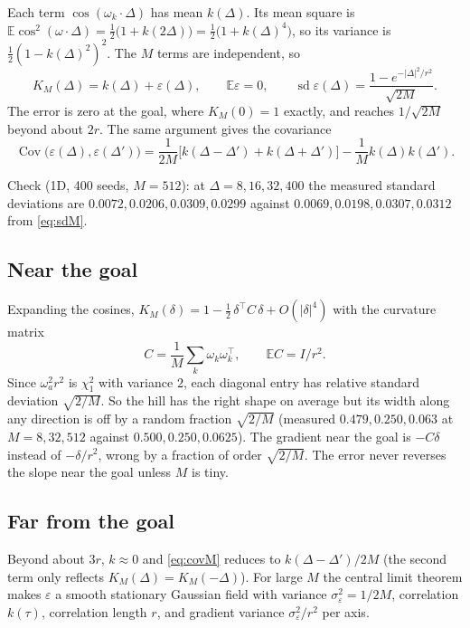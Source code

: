 \documentclass[11pt]{article}
\newcommand{\E}{\mathbb{E}}
\newcommand{\Cov}{\operatorname{Cov}}
\begin{document}
Each term $\cos(\omega_k\cdot\Delta)$ has mean $k(\Delta)$. Its mean square is
$\E\cos^2(\omega\cdot\Delta) = \tfrac12\bigl(1 + k(2\Delta)\bigr) = \tfrac12\bigl(1 + k(\Delta)^4\bigr)$,
so its variance is $\tfrac12(1 - k(\Delta)^2)^2$. The $M$ terms are independent, so
\begin{equation}
  K_M(\Delta) = k(\Delta) + \varepsilon(\Delta), \qquad
  \E\varepsilon = 0, \qquad
  \operatorname{sd}\varepsilon(\Delta) = \frac{1 - e^{-|\Delta|^2/r^2}}{\sqrt{2M}} .
  \label{eq:sdM}
\end{equation}
The error is zero at the goal, where $K_M(0) = 1$ exactly, and reaches $1/\sqrt{2M}$ beyond about
$2r$. The same argument gives the covariance
\begin{equation}
  \Cov\bigl(\varepsilon(\Delta), \varepsilon(\Delta')\bigr)
  = \frac{1}{2M}\bigl[k(\Delta-\Delta') + k(\Delta+\Delta')\bigr] - \frac{1}{M}k(\Delta)k(\Delta') .
  \label{eq:covM}
\end{equation}

\noindent Check (1D, 400 seeds, $M = 512$): at $\Delta = 8, 16, 32, 400$ the measured standard
deviations are $0.0072, 0.0206, 0.0309, 0.0299$ against $0.0069, 0.0198, 0.0307, 0.0312$ from
\eqref{eq:sdM}.

\subsection{Near the goal}

Expanding the cosines, $K_M(\delta) = 1 - \tfrac12\,\delta^\top C\,\delta + O(|\delta|^4)$ with the
curvature matrix
\begin{equation}
  C = \frac{1}{M}\sum_k \omega_k\omega_k^\top, \qquad \E C = I/r^2 .
\end{equation}
Since $\omega_a^2 r^2$ is $\chi^2_1$ with variance $2$, each diagonal entry has relative standard
deviation $\sqrt{2/M}$. So the hill has the right shape on average but its width along any
direction is off by a random fraction $\sqrt{2/M}$ (measured $0.479, 0.250, 0.063$ at $M = 8, 32,
512$ against $0.500, 0.250, 0.0625$). The gradient near the goal is $-C\delta$ instead of
$-\delta/r^2$, wrong by a fraction of order $\sqrt{2/M}$. The error never reverses the slope near
the goal unless $M$ is tiny.

\subsection{Far from the goal}

Beyond about $3r$, $k \approx 0$ and \eqref{eq:covM} reduces to $k(\Delta - \Delta')/2M$ (the second
term only reflects $K_M(\Delta) = K_M(-\Delta)$). For large $M$ the central limit theorem makes
$\varepsilon$ a smooth stationary Gaussian field with variance $\sigma_\varepsilon^2 = 1/2M$, correlation
$k(\tau)$, correlation length $r$, and gradient variance $\sigma_\varepsilon^2/r^2$ per axis.
\end{document}
